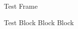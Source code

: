\begin{frame}{Test Frame}
    \begin{block}{Test Block}
        Block
        \newline
        Block
    \end{block}
\end{frame}
